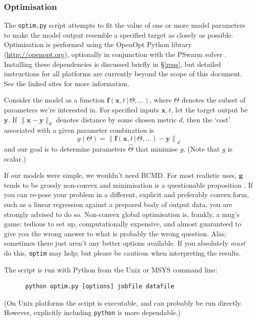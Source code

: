 \documentclass[a4paper,11pt]{article}
\newcommand{\vv}[1]{\mathbf{#1}}
\begin{document}
\subsubsection{Optimisation}\label{batch:optim}

The \texttt{optim.py} script attempts to fit the value of one or more model parameters to make the model output resemble a specified target as closely as possible. Optimisation is performed using the OpenOpt Python library (\url{http://openopt.org}), optionally in conjunction with the PSwarm solver \citep[][\url{http://www.norg.uminho.pt/aivaz/pswarm/}]{Vaz:2009wa}. Installing these dependencies is discussed briefly in \S\ref{reqs}, but detailed instructions for all platforms are currently beyond the scope of this document. See the linked sites for more information.

Consider the model as a function $\vv{f}(\vv{x}, t \, | \, \Theta, ...)$, where $\Theta$ denotes the subset of parameters we're interested in. For specified inputs $\vv{x}, t$, let the target output be $\vv{y}$. If $\| \vv{x} - \vv{y} \|_{d}$ denotes distance by some chosen metric $d$, then the `cost' associated with a given parameter combination is
\begin{equation}
 g(\Theta) = \left\| \vv{f}(\vv{x}, t \, | \, \Theta,...) - \vv{y} \right\|_{d}
\end{equation}
and our goal is to determine parameters $\hat{\Theta}$ that minimise $g$. (Note that $g$ is scalar.)

If our models were simple, we wouldn't need BCMD. For most realistic uses, $\vv{g}$ tends to be grossly non-convex and minimisation is a questionable proposition \citep[see][]{Boyd:2004uz}. If you can re-pose your problem in a different, explicit and preferably convex form, such as a linear regression against a prepared body of output data, you are strongly advised to do so. Non-convex global optimisation is, frankly, a mug's game: tedious to set up, computationally expensive, and almost guaranteed to give you the wrong answer to what is probably the wrong question. Alas, sometimes there just aren't any better options available. If you absolutely \textit{must} do this, \texttt{optim} may help; but please be cautious when interpreting the results.

The script is run with Python from the Unix or MSYS command line:
\begin{verbatim}
      python optim.py [options] jobfile datafile
\end{verbatim}
(On Unix platforms the script is executable, and can probably be run directly. However, explicitly including \texttt{python} is more dependable.)
\end{document}
